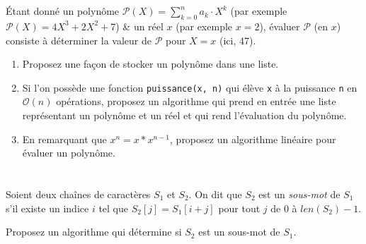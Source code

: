 \documentclass
[12pt]
{article}
\begin{document}
\section{}

\'Etant donné un polynôme $\mathcal{P}(X) = \sum_{k=0}^{n} a_k\cdot X^k$ (par exemple  $\mathcal{P}(X) = 4X^3 + 2X^2 +7$) \& un réel $x$ (par exemple $x=2$), évaluer $\mathcal{P}$ (en $x$) consiste à déterminer la valeur de $\mathcal{P}$ pour $X=x$ (ici, 47).

\begin{enumerate}
    \item Proposez une façon de stocker un polynôme dans une liste.
    \item  Si l'on possède une fonction \texttt{puissance(x, n)} qui élève \texttt{x} à la puissance \texttt{n} en $\mathcal{O}(n)$ opérations,  proposez un algorithme qui prend en entrée une liste représentant un polynôme et un réel et qui rend l'évaluation du polynôme. 
    \item En remarquant que $x^n = x * x^{n-1}$, proposez un algorithme linéaire pour évaluer un polynôme.
\end{enumerate}

\section{}

 Soient deux chaînes de caractères $S_1$ et $S_2$. On dit que $S_2$ est un {\em sous-mot} de $S_1$ s'il existe un indice $i$ tel que $S_2[j] = S_1[i + j]$ pour tout $j$ de $0$ à $len(S_2) - 1$.


 Proposez un algorithme qui détermine si $S_2$ est un sous-mot de $S_1$.
 
\end{document}
